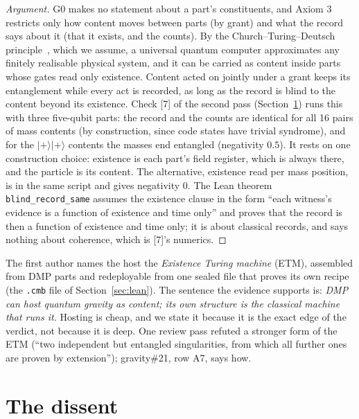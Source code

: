 \documentclass[11pt,a4paper]{article}
\theoremstyle{definition}
\theoremstyle{remark}
\newcommand{\lean}[1]{\texttt{#1}}
\newcommand{\chk}[1]{\textsf{[#1]}}
\begin{document}
\begin{proof}[Argument]
G0 makes no statement about a part's constituents, and Axiom 3 restricts only how content moves between parts (by grant) and what the
record says about it (that it exists, and the counts). By the Church--Turing--Deutsch principle~\cite{deutsch}, which we assume, a universal
quantum computer approximates any finitely realisable physical system, and it can be carried as content inside parts whose gates read
only existence. Content acted on jointly under a grant keeps its entanglement while every act is recorded, as long as the record is blind
to the content beyond its existence. Check \chk{7} of the second pass (Section~\ref{sec:dissent}) runs this with three five-qubit parts:
the record and the counts are identical for all 16 pairs of mass contents (by construction, since code states have trivial syndrome), and
for the $\lvert+\rangle\lvert+\rangle$ contents the masses end entangled (negativity $0.5$). It rests on one construction choice: existence
is each part's field register, which is always there, and the particle is its content. The alternative, existence read per mass position,
is in the same script and gives negativity $0$. The Lean theorem \lean{blind\_record\_same} assumes the existence clause in the form
``each witness's evidence is a function of existence and time only'' and proves that the record is then a function of existence and time
only; it is about classical records, and says nothing about coherence, which is \chk{7}'s numerics.
\end{proof}

\noindent The first author names the host the \emph{Existence Turing machine} (ETM), assembled from DMP parts and redeployable from one
sealed file that proves its own recipe (the \texttt{.cmb} file of Section~\ref{sec:lean}). The sentence the evidence supports is:
\emph{DMP can host quantum gravity as content; its own structure is the classical machine that runs it.} Hosting is cheap, and we state
it because it is the exact edge of the verdict, not because it is deep. One review pass refuted a stronger form of the ETM (``two
independent but entangled singularities, from which all further ones are proven by extension''); gravity\#21, row A7, says how.

\section{The dissent}\label{sec:dissent}
\end{document}

